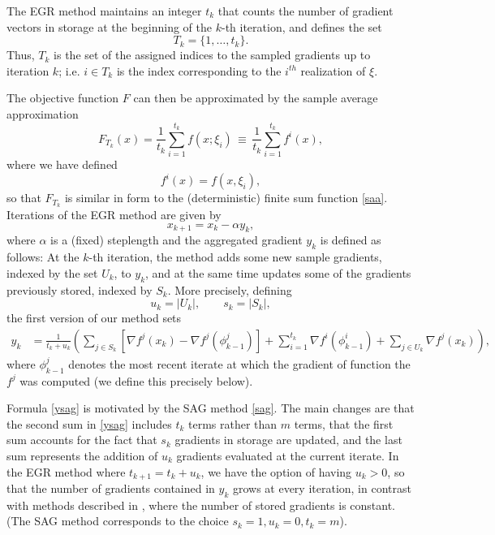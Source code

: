 \documentclass[11pt]{article}
\begin{document}
The EGR method maintains an integer $t_k $ that counts the number of gradient vectors in storage at the beginning of the $k$-th iteration, and defines the set
\begin{equation} \label{capt}
         T_k = \{1, \ldots, t_k\}. 
 \end{equation}
 Thus, $T_k$ is the set of the assigned indices to the sampled gradients up to iteration $k$; i.e. $i\in T_k$ is the index corresponding to the $i^{th}$ realization of $\xi$.
 
 The objective function $F$ can then be approximated by the sample average approximation
\begin{equation}  \label{batch}
	F_{T_k}(x)= \frac{1}{t_k} \sum_{i =1}^{ t_k} f(x; \xi_i) \, \equiv \,  \frac{1}{t_k} \sum_{i =1}^{ t_k} f^i (x) ,
\end{equation}
where  we have defined
\begin{equation} \label{spring}
	f^i(x) =  f(x, \xi_i) ,
\end{equation}
so that $F_{T_k}$ is similar in form to the (deterministic) finite sum function \eqref{saa}.
Iterations of the EGR method are given by
\begin{equation}  \label{egri}
        x_{k+1}= x_k - \alpha y_k ,
\end{equation}
where $\alpha$ is a (fixed) steplength and the aggregated gradient $y_k$ is defined as follows: At the $k$-th iteration, the method adds some new sample gradients, indexed by the set $U_k$, to $y_k$, and at the same time updates some of the gradients previously stored, indexed by $S_k$. More precisely, defining
\begin{equation}   \label{usdef}
      u_k = | U_k |, \qquad s_k = | S_k |,
\end{equation}
the first version of our method sets
\begin{align}  \label{ysag}
      y_k & =  \frac{1}{t_{k}+u_k}  \left( \sum_{j \in S_k} \left[  \nabla f^j(x_{k}) -  \nabla f^j(\phi_{k-1}^j)\right]+ \sum_{i = 1}^{t_{k} }  \nabla f^i (\phi^i_{k-1})  + \sum_{j \in U_k} \nabla f^j(x_k) \right) ,
\end{align}
where  $\phi_{k-1}^j$ denotes the most recent iterate at which the gradient of function the $f^j$ was computed (we define this precisely below). 

Formula \eqref{ysag} is motivated by the SAG method \eqref{sag}.   The main changes are that the  second sum in \eqref{ysag}  includes $t_k$ terms rather than $m$ terms, that the first sum accounts for the fact that $s_k$ gradients in storage are updated, and the last sum represents the addition of $ u_k$ gradients evaluated at the current iterate.  In the EGR method where $t_{k+1}= t_{k} + u_k$, we have the option of having $u_k >0$,  so that the number of gradients contained in $y_k$ grows at every iteration, in contrast with methods described in 
\cite{johnson2013accelerating,NIPS2014_5258,shalev2013stochastic,mairal2015incremental,defazio2014finito},
 where the number of stored gradients is constant. (The SAG method corresponds to the choice $s_k=1, u_k =0, t_k=m$).
 
\end{document}
